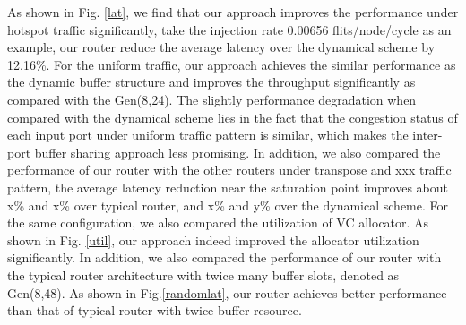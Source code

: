 \documentclass[10pt,conference]{IEEEtran}
\begin{document}
As shown in Fig. \ref{lat}, we find that our approach improves the performance under hotspot traffic significantly, take the injection rate 0.00656 flits/node/cycle as an example, our router reduce the average latency over the dynamical scheme by 12.16\%. For the uniform traffic, our approach achieves the similar performance as the dynamic buffer structure and improves the throughput significantly as compared with the Gen(8,24). The slightly performance degradation when compared with the dynamical scheme lies in the fact that the congestion status of each input port under uniform traffic pattern is similar, which makes the inter-port buffer sharing approach less promising. In addition, we also compared the performance of our router with the other routers under transpose and xxx traffic pattern, the average latency reduction near the saturation point improves about x\% and x\% over typical router, and x\% and y\% over the dynamical scheme. For the same configuration, we also compared the utilization of VC allocator. As shown in Fig. \ref{util}, our approach indeed improved the allocator utilization significantly. In addition, we also compared the performance of our router with the typical router architecture with twice many buffer slots, denoted as Gen(8,48). As shown in Fig.\ref{randomlat}, our router achieves better performance than that of typical router with twice buffer resource.

\end{document}

